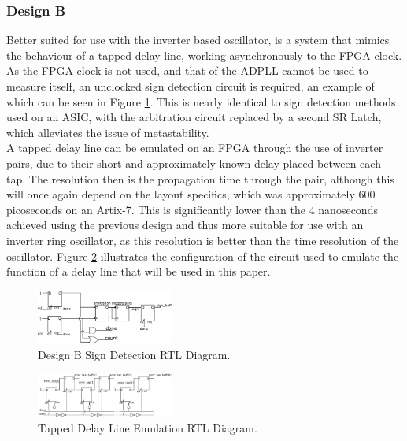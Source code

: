 \documentclass[conference]{IEEEtran}
\begin{document}
{\subsubsection*{Design B}
Better suited for use with the inverter based oscillator, is a system that mimics the behaviour of a tapped delay line, working asynchronously to the FPGA clock. As the FPGA clock is not used, and that of the ADPLL cannot be used to measure itself, an unclocked sign detection circuit is required, an example of which can be seen in Figure \ref{fig:segn_pdetdl}. This is nearly identical to sign detection methods used on an ASIC, with the arbitration circuit replaced by a second SR Latch, which alleviates the issue of metastability.\\
A tapped delay line can be emulated on an FPGA through the use of inverter pairs, due to their short and approximately known delay placed between each tap.
The resolution then is the propagation time through the pair, although this will once again depend on the layout specifics, which was approximately 600 picoseconds on an Artix-7. This is significantly lower than the 4 nanoseconds achieved using the previous design and thus more suitable for use with an inverter ring oscillator, as this resolution is better than the time resolution of the oscillator. Figure \ref{fig:num_pdetdl} illustrates the configuration of the circuit used to emulate the function of a delay line that will be used in this paper.
\begin{figure}[h]
    \centering
    \includegraphics[width=0.4\textwidth]{../new_pdet1}
    \caption{Design B Sign Detection RTL Diagram.}
    \label{fig:segn_pdetdl}
\end{figure}
\begin{figure}[h]
    \centering
    \includegraphics[width=0.4\textwidth]{../new_pdet2}
    \caption{Tapped Delay Line Emulation RTL Diagram.}
    \label{fig:num_pdetdl}
\end{figure}
}
\end{document}
